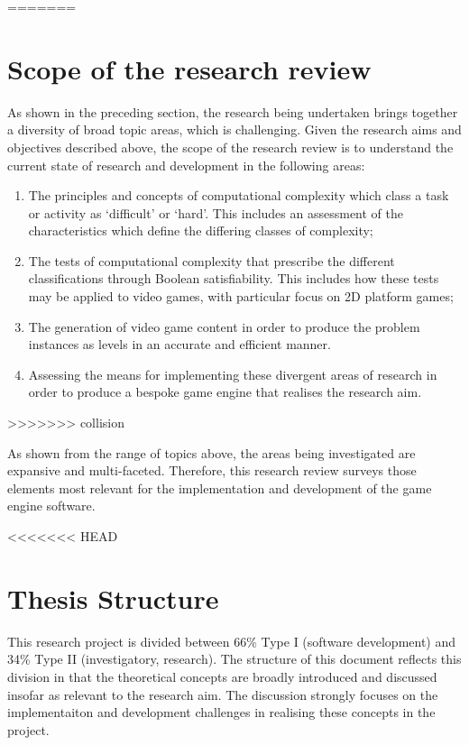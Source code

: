 \documentclass[11pt, a4paper, oneside]{report} %
\begin{document}
=======
\section{Scope of the research review}

As shown in the preceding section, the research being undertaken brings together
a diversity of broad topic areas, which is challenging. Given the research aims
and objectives described above, the scope of the research review is to
understand the current state of research and development in the following areas:

\begin{enumerate}

  \item The principles and concepts of computational complexity which class a task or activity as
  `difficult' or `hard'. This includes an assessment of the characteristics which define the
  differing classes of complexity;

  \item  The tests of computational complexity that prescribe the different classifications through
  Boolean satisfiability. This includes how these tests may be applied to video games, with
  particular focus on 2D platform games;

  \item The generation of video game content in order to produce the problem instances as levels in
  an accurate and efficient manner.

  \item Assessing the means for implementing these divergent areas of research in order to produce a
  bespoke game engine that realises the research aim.


\end{enumerate}
>>>>>>> collision

As shown from the range of topics above, the areas being investigated are
expansive and multi-faceted. Therefore, this research review surveys those
elements most relevant for the implementation and development of the game engine
software.

<<<<<<< HEAD
\section{Thesis Structure}

This research project is divided between 66\% Type I (software development) and
34\% Type II (investigatory, research). The structure of this document reflects
this division in that the theoretical concepts are broadly introduced and
discussed insofar as relevant to the research aim. The discussion strongly
focuses on the  implementaiton and development challenges in realising these
concepts in the project.
\end{document}
